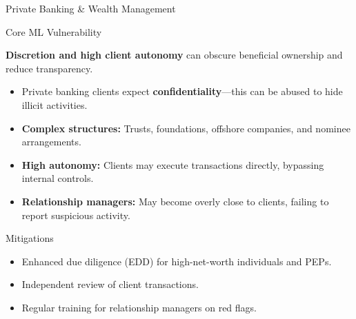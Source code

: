 \documentclass{beamer}
\begin{document}
	\begin{frame}{Private Banking \& Wealth Management}
		\begin{block}{Core ML Vulnerability}
			\begin{center}
				\textbf{Discretion and high client autonomy} can obscure beneficial ownership and reduce transparency.
			\end{center}
		\end{block}
		\begin{itemize}
			\item Private banking clients expect \textbf{confidentiality}—this can be abused to hide illicit activities.
			\item \textbf{Complex structures:} Trusts, foundations, offshore companies, and nominee arrangements.
			\item \textbf{High autonomy:} Clients may execute transactions directly, bypassing internal controls.
			\item \textbf{Relationship managers:} May become overly close to clients, failing to report suspicious activity.
		\end{itemize}
		\begin{block}{Mitigations}
			\begin{itemize}
				\item Enhanced due diligence (EDD) for high-net-worth individuals and PEPs.
				\item Independent review of client transactions.
				\item Regular training for relationship managers on red flags.
			\end{itemize}
		\end{block}
	\end{frame}
	
\end{document}

